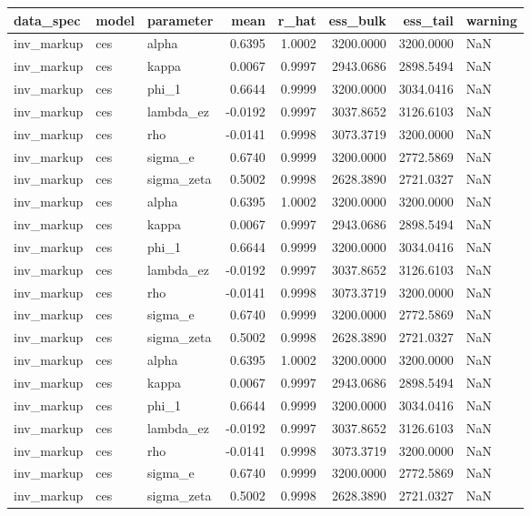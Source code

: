 \begin{tabular}{lllrrrrl}
\toprule
data\_spec & model & parameter & mean & r\_hat & ess\_bulk & ess\_tail & warning \\
\midrule
inv\_markup & ces & alpha & 0.6395 & 1.0002 & 3200.0000 & 3200.0000 & NaN \\
inv\_markup & ces & kappa & 0.0067 & 0.9997 & 2943.0686 & 2898.5494 & NaN \\
inv\_markup & ces & phi\_1 & 0.6644 & 0.9999 & 3200.0000 & 3034.0416 & NaN \\
inv\_markup & ces & lambda\_ez & -0.0192 & 0.9997 & 3037.8652 & 3126.6103 & NaN \\
inv\_markup & ces & rho & -0.0141 & 0.9998 & 3073.3719 & 3200.0000 & NaN \\
inv\_markup & ces & sigma\_e & 0.6740 & 0.9999 & 3200.0000 & 2772.5869 & NaN \\
inv\_markup & ces & sigma\_zeta & 0.5002 & 0.9998 & 2628.3890 & 2721.0327 & NaN \\
inv\_markup & ces & alpha & 0.6395 & 1.0002 & 3200.0000 & 3200.0000 & NaN \\
inv\_markup & ces & kappa & 0.0067 & 0.9997 & 2943.0686 & 2898.5494 & NaN \\
inv\_markup & ces & phi\_1 & 0.6644 & 0.9999 & 3200.0000 & 3034.0416 & NaN \\
inv\_markup & ces & lambda\_ez & -0.0192 & 0.9997 & 3037.8652 & 3126.6103 & NaN \\
inv\_markup & ces & rho & -0.0141 & 0.9998 & 3073.3719 & 3200.0000 & NaN \\
inv\_markup & ces & sigma\_e & 0.6740 & 0.9999 & 3200.0000 & 2772.5869 & NaN \\
inv\_markup & ces & sigma\_zeta & 0.5002 & 0.9998 & 2628.3890 & 2721.0327 & NaN \\
inv\_markup & ces & alpha & 0.6395 & 1.0002 & 3200.0000 & 3200.0000 & NaN \\
inv\_markup & ces & kappa & 0.0067 & 0.9997 & 2943.0686 & 2898.5494 & NaN \\
inv\_markup & ces & phi\_1 & 0.6644 & 0.9999 & 3200.0000 & 3034.0416 & NaN \\
inv\_markup & ces & lambda\_ez & -0.0192 & 0.9997 & 3037.8652 & 3126.6103 & NaN \\
inv\_markup & ces & rho & -0.0141 & 0.9998 & 3073.3719 & 3200.0000 & NaN \\
inv\_markup & ces & sigma\_e & 0.6740 & 0.9999 & 3200.0000 & 2772.5869 & NaN \\
inv\_markup & ces & sigma\_zeta & 0.5002 & 0.9998 & 2628.3890 & 2721.0327 & NaN \\

\end{tabular}

